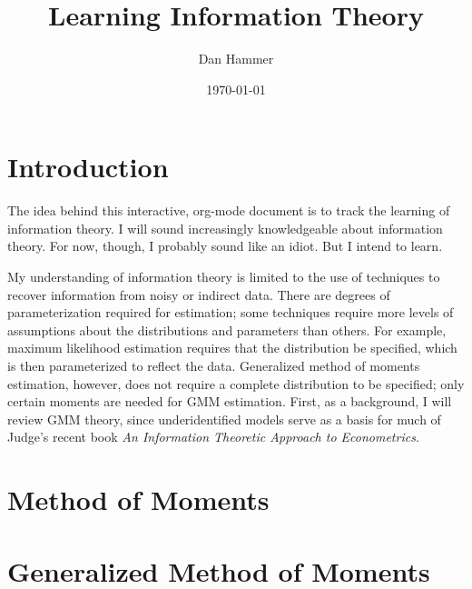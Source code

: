\documentclass{article}
\title{Learning Information Theory}
\author{Dan Hammer}
\date{\today}
\begin{document}
\maketitle

\newcommand{\sss}{$s^2$ }
\newcommand{\R}{\texttt{R} }
\newcommand{\ep}{{\bf e}^\prime}
\newcommand{\e}{{\bf e}}
\newcommand{\Rs}{R^2}
\newcommand{\yp}{{\bf y}^\prime}
\newcommand{\y}{{\bf y}}
\newcommand{\X}{{\bf X}}
\newcommand{\Q}{{\bf Q}}
\newcommand{\J}{{\bf J}}
\newcommand{\Xp}{{\bf X}^{\prime}}
\newcommand{\Z}{{\bf Z}}
\newcommand{\Zp}{{\bf Z}^{\prime}}
\renewcommand{\P}{{\bf P}}
\renewcommand{\Pp}{{\bf P}^{\prime}}
\renewcommand{\In}{{\bf I}_n}
\newcommand{\Zin}{(\Zp\Z)^{-1}}
\newcommand{\E}{\mathbb{E}}
\newcommand{\V}{\mathbb{V}}
\newcommand{\sigs}{\sigma^2}

\section*{Introduction}
\label{sec-1}


The idea behind this interactive, org-mode document is to track the learning of information theory.  I will sound increasingly knowledgeable about information theory.  For now, though, I probably sound like an idiot.  But I intend to learn.

My understanding of information theory is limited to the use of techniques to recover information from noisy or indirect data.  There are degrees of parameterization required for estimation; some techniques require more levels of assumptions about the distributions and parameters than others.  For example, maximum likelihood estimation requires that the distribution be specified, which is then parameterized to reflect the data.  Generalized method of moments estimation, however, does not require a complete distribution to be specified; only certain moments are needed for GMM estimation.  First, as a background, I will review GMM theory, since underidentified models serve as a basis for much of Judge's recent book \emph{An Information Theoretic Approach to Econometrics}.
\section*{Method of Moments}
\label{sec-2}
\section*{Generalized Method of Moments}
\label{sec-3}
\end{document}
